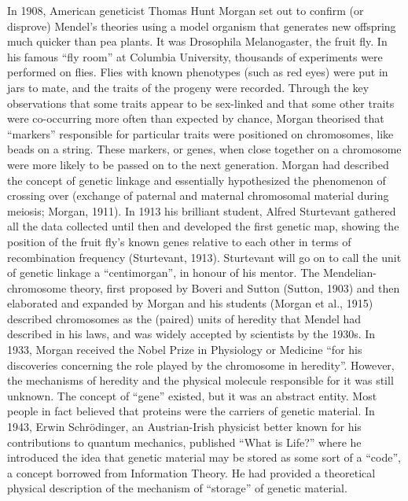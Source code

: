 In 1908, American geneticist Thomas Hunt Morgan set out to confirm (or disprove) Mendel’s theories using a model organism that generates new offspring much quicker than pea plants. 
It was Drosophila Melanogaster, the fruit fly. 
In his famous “fly room” at Columbia University, thousands of experiments were performed on flies. 
Flies with known phenotypes (such as red eyes) were put in jars to mate, and the traits of the progeny were recorded. 
Through the key observations that some traits appear to be sex-linked and that some other traits were co-occurring more often than expected by chance, Morgan theorised that “markers” responsible for particular traits were positioned on chromosomes, like beads on a string.
These markers, or genes, when close together on a chromosome were more likely to be passed on to the next generation. 
Morgan had described the concept of genetic linkage and essentially hypothesized the phenomenon of crossing over (exchange of paternal and maternal chromosomal material during meiosis; Morgan, 1911). 
In 1913 his brilliant student, Alfred Sturtevant gathered all the data collected until then and developed the first genetic map, showing the position of the fruit fly’s known genes relative to each other in terms of recombination frequency (Sturtevant, 1913). 
Sturtevant will go on to call the unit of genetic linkage a “centimorgan”, in honour of his mentor.
\vspace{4mm}
The Mendelian-chromosome theory, first proposed by Boveri and Sutton (Sutton, 1903) and then elaborated and expanded by Morgan and his students (Morgan et al., 1915) described chromosomes as the (paired) units of heredity that Mendel had described in his laws, and was widely accepted by scientists by the 1930s. 
In 1933, Morgan received the Nobel Prize in Physiology or Medicine “for his discoveries concerning the role played by the chromosome in heredity”.
\vspace{4mm}
However, the mechanisms of heredity and the physical molecule responsible for it was still unknown. 
The concept of “gene” existed, but it was an abstract entity. 
Most people in fact believed that proteins were the carriers of genetic material. 
In 1943, Erwin  Schrödinger, an Austrian-Irish physicist better known for his contributions to quantum mechanics, published “What is Life?” where he introduced the idea that genetic material may be stored as some sort of a “code”, a concept borrowed from Information Theory. 
He had provided a theoretical physical description of the mechanism of “storage” of genetic material. 
\vspace{4mm}
